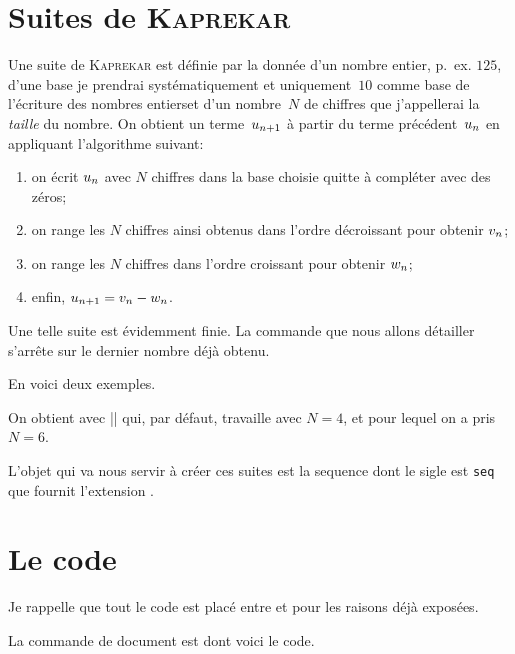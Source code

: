 
\section{Suites de \textsc{Kaprekar}}
\label{sec:suiteskaprekar}

Une suite de \textsc{Kaprekar} est définie par la donnée d'un nombre
entier, p.~ex. \(125\), d'une base \TO je prendrai systématiquement et
uniquement~\(10\) comme base de l'écriture des nombres entiers\TF et
d'un nombre~\(N\) de chiffres que j'appellerai la \emph{taille} du
nombre. On obtient un terme~\(u\sb{n+1}\) à partir du terme
précédent~\(u\sb{n}\) en appliquant l'algorithme suivant:
\begin{enumerate}\label{algokap}
\item on écrit \(u\sb{n}\) avec \(N\) chiffres dans la base choisie
  quitte à compléter avec des zéros; 
\item on range les \(N\) chiffres ainsi obtenus dans l'ordre
  décroissant pour obtenir \(v\sb{n}\); 
\item on range les \(N\) chiffres dans l'ordre croissant pour obtenir
  \(w\sb{n}\); 
\item enfin, \(u\sb{n+1} = v\sb{n} - w\sb{n}\).
\end{enumerate}

Une telle suite est évidemment finie. La commande que nous allons
détailler s'arrête sur le dernier nombre déjà obtenu.

En voici deux exemples.

On obtient \og {}\fg avec || qui, par
défaut, travaille avec \(N=4\), et \og {}\fg pour
lequel on a pris \(N=6\).

L'objet qui va nous servir à créer ces suites est la \gls{sequence}
\TO dont le sigle est \texttt{seq} \TF que fournit l'extension
.


\section{Le code}
\label{sec:kaprekarcode}

Je rappelle que tout le code est placé entre 
et  pour les raisons déjà exposées.

La commande de document est  dont voici le code.



